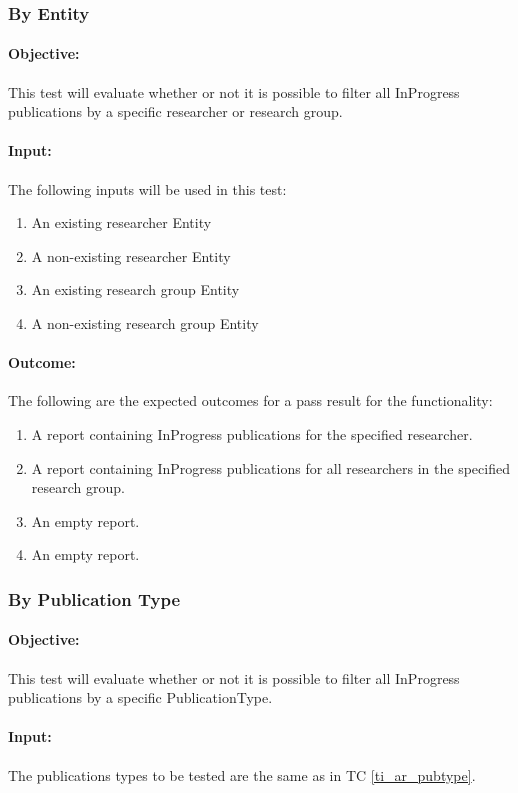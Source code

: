 \subsubsection{By Entity} \label{ti_sr_entity}
\paragraph{Objective:}
This test will evaluate whether or not it is possible to filter all InProgress publications by a specific researcher or research group.
\paragraph{Input:}
The following inputs will be used in this test:
\begin{enumerate}
	\item An existing researcher Entity
	\item A non-existing researcher Entity
	\item An existing research group Entity
	\item A non-existing research group Entity
\end{enumerate}
\paragraph{Outcome:}
The following are the expected outcomes for a pass result for the functionality:
\begin{enumerate}
	\item A report containing InProgress publications for the specified researcher.
	\item A report containing InProgress publications for all researchers in the specified research group.
	\item An empty report.
	\item An empty report.
\end{enumerate}

\subsubsection{By Publication Type} \label{ti_sr_pubtype}
\paragraph{Objective:}
This test will evaluate whether or not it is possible to filter all InProgress publications by a specific PublicationType.
\paragraph{Input:}
The publications types to be tested are the same as in TC \ref{ti_ar_pubtype}.
